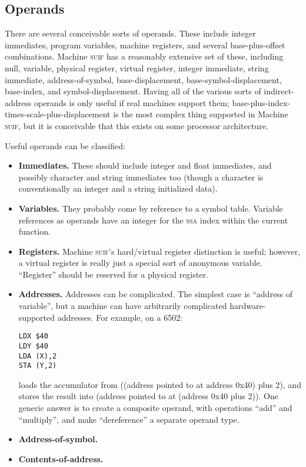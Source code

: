 \documentclass[11pt]{article}
\def\ssa{\textsc{ssa}}
\def\suif{\textsc{suif}}
\def\machsuif{Machine \suif}
\begin{document}
\subsection{Operands}

There are several conceivable sorts of operands.  These include
integer immediates, program variables, machine registers, and several
base-plus-offset combinations.  \machsuif{} has a reasonably extensive
set of these, including null, variable, physical register, virtual
register, integer immediate, string immediate, address-of-symbol,
base-displacement, base-symbol-displacement, base-index, and
symbol-displacement.  Having all of the various sorts of
indirect-address operands is only useful if real machines support
them; base-plus-index-times-scale-plus-displacement is the most
complex thing supported in \machsuif, but it is conceivable that this
exists on some processor architecture.

Useful operands can be classified:

\begin{itemize}
\item \textbf{Immediates.}  These should include integer and float
  immediates, and possibly character and string immediates too (though
  a character is conventionally an integer and a string initialized
  data).
\item \textbf{Variables.}  They probably come by reference to a symbol
  table.  Variable references as operands have an integer for the \ssa{}
  index within the current function.
\item \textbf{Registers.}  \machsuif's hard/virtual register
  distinction is useful; however, a virtual register is really just a
  special sort of anonymous variable.  ``Register'' should be reserved
  for a physical register.
\item \textbf{Addresses.}  Addresses can be complicated.  The simplest
  case is ``address of variable'', but a machine can have arbitrarily
  complicated hardware-supported addresses.  For example, on a 6502:
\begin{verbatim}
LDX $40
LDY $40
LDA (X),2
STA (Y,2)
\end{verbatim}
  loads the accumulator from ((address pointed to at address 0x40) plus
  2), and stores the result into (address pointed to at (address 0x40
  plus 2)).  One generic answer is to create a composite operand, with
  operations ``add'' and ``multiply'', and make ``dereference'' a
  separate operand type.
\item \textbf{Address-of-symbol.}
\item \textbf{Contents-of-address.}
\end{itemize}
\end{document}
